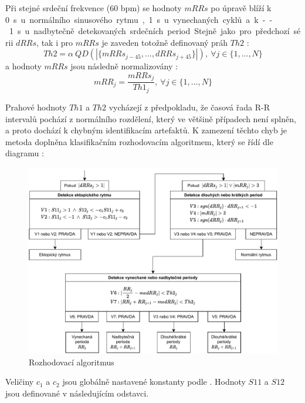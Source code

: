 Při stejné srdeční frekvence (60 bpm) se hodnoty $mRRs$ po úpravě blíží k
0~\si\s~u normálního sinusového rytmu, 1~\si\s~ u vynechaných cyklů a k
--1~\si\s~ u nadbytečně detekovaných srdečních period. Stejně jako pro předchozí
sérii $dRRs$, tak i pro $mRRs$ je zaveden totožně definovaný práh $Th2$
\cite{Lipponen2019}:
\begin{equation}
    Th2 = \alpha~QD(|\{mRRs_{j-45},...,dRRs_{j+45}\}|), ~\forall j \in \{1,...,N\}
\end{equation}
a hodnoty $mRRs$ jsou následně normalizovány \cite{Lipponen2019}:
\begin{equation}
    mRR_j = \frac{mRRs_j}{Th1_j}, ~\forall j \in \{1,...,N\}
\end{equation}

Prahové hodnoty $Th1$ a $Th2$ vycházejí z předpokladu, že časová řada R-R
intervalů pochází z normálního rozdělení, který ve většině případech není
splněn, a proto dochází k chybným identifikacím artefaktů. K zamezení těchto
chyb je metoda doplněna klasifikačním rozhodovacím algoritmem, který se řídí dle
diagramu \cite{Lipponen2019}:

\begin{figure}[h]
    \begin{center}
        \includegraphics[width=1\textwidth]{../assets/diagrams/rr_decision}
        \caption{Rozhodovací algoritmus \cite{Lipponen2019}}
        \label{fig:rr_decision}
    \end{center}
\end{figure}

Veličiny $c_1$ a $c_2$ jsou globálně nastavené konstanty podle
\cite{Lipponen2019}. Hodnoty $S11$ a $S12$ jsou definované v následujícím
odstavci.


